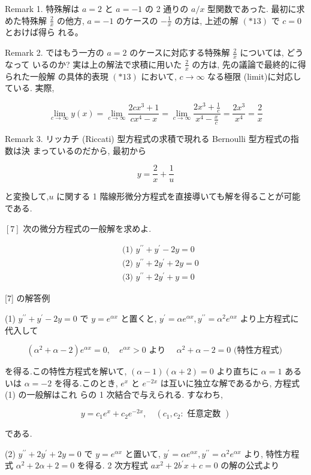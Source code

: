 \documentclass[10pt]{article}
\begin{document}
Remark 1. 特殊解は $a=2$ と $a=-1$ の 2 通りの $a / x$ 型関数であった. 最初に求めた特殊解 $\frac{2}{x}$ の他方, $a=-1$ のケースの $-\frac{1}{x}$ の方は, 上述の解 $(* 13)$ で $c=0$ とおけば得ら れる。

Remark 2. ではもう一方の $a=2$ のケースに対応する特殊解 $\frac{2}{x}$ については, どうなって いるのか? 実は上の解法で求積に用いた $\frac{2}{x}$ の方は, 先の議論で最終的に得られた一般解 の具体的表現 $(* 13)$ において, $c \rightarrow \infty$ なる極限 (limit)に対応している. 実際,

$$
\lim _{c \rightarrow \infty} y(x)=\lim _{c \rightarrow \infty} \frac{2 c x^{3}+1}{c x^{4}-x}=\lim _{c \rightarrow \infty} \frac{2 x^{3}+\frac{1}{c}}{x^{4}-\frac{x}{c}}=\frac{2 x^{3}}{x^{4}}=\frac{2}{x}
$$

Remark 3. リッカチ (Riccati) 型方程式の求積で現れる Bernoulli 型方程式の指数は決 まっているのだから, 最初から

$$
y=\frac{2}{x}+\frac{1}{u}
$$

と変換して,$u$ に関する 1 階線形微分方程式を直接導いても解を得ることが可能である.

$[7]$ 次の微分方程式の一般解を求めよ.


\begin{align*}
& \text { (1) } y^{\prime \prime}+y^{\prime}-2 y=0  \tag{8}\\
& \text { (2) } y^{\prime \prime}+2 y^{\prime}+2 y=0  \tag{9}\\
& \text { (3) } y^{\prime \prime}+2 y^{\prime}+y=0 \tag{10}
\end{align*}


[7] の解答例

(1) $y^{\prime \prime}+y^{\prime}-2 y=0$ で $y=e^{\alpha x}$ と置くと, $y^{\prime}=\alpha e^{\alpha x}, y^{\prime \prime}=\alpha^{2} e^{\alpha x}$ より上方程式に代入して

$$
\left(\alpha^{2}+\alpha-2\right) e^{\alpha x}=0, \quad e^{\alpha x}>0 \text { より } \quad \alpha^{2}+\alpha-2=0 \text { (特性方程式) }
$$

を得る.この特性方程式を解いて, $(\alpha-1)(\alpha+2)=0$ より直ちに $\alpha=1$ あるいは $\alpha=-2$ を得る.このとき, $e^{x}$ と $e^{-2 x}$ は互いに独立な解であるから, 方程式 (1) の一般解はこれ らの 1 次結合で与えられる. すなわち,

$$
y=c_{1} e^{x}+c_{2} e^{-2 x}, \quad\left(c_{1}, c_{2}: \text { 任意定数 }\right)
$$

である.

(2) $y^{\prime \prime}+2 y^{\prime}+2 y=0$ で $y=e^{\alpha x}$ と置いて, $y^{\prime}=\alpha e^{\alpha x}, y^{\prime \prime}=\alpha^{2} e^{\alpha x}$ より, 特性方程式 $\alpha^{2}+2 \alpha+2=0$ を得る. 2 次方程式 $a x^{2}+2 b^{\prime} x+c=0$ の解の公式より
\end{document}
